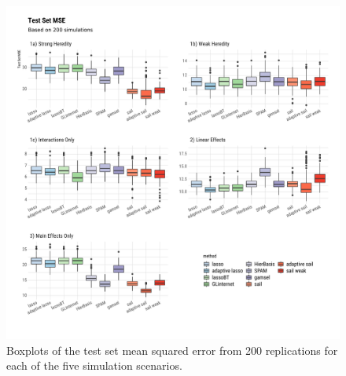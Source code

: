\documentclass[a4paper,fleqn]{cas-sc}
\begin{document}
\begin{figure}
	
	{\centering \includegraphics[width=1\linewidth]{figure/plot-mse-sim-1} 
		
	}
	
	\caption[Boxplots of the test set mean squared error from 200 replications for each of the five simulation scenarios]{Boxplots of the test set mean squared error from 200 replications for each of the five simulation scenarios.}\label{fig:plot-mse-sim}
\end{figure}




%
%
%

\end{document}

